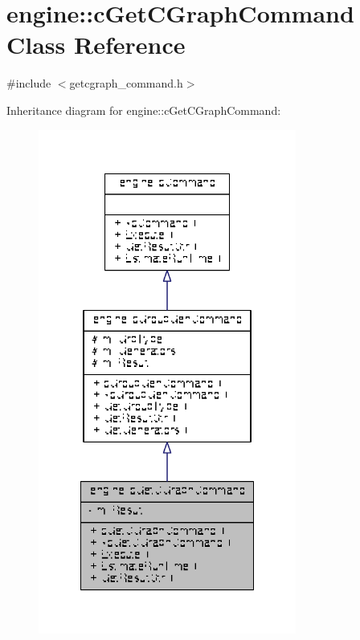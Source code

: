 \hypertarget{classengine_1_1cGetCGraphCommand}{\section{engine\-:\-:c\-Get\-C\-Graph\-Command Class Reference}
\label{classengine_1_1cGetCGraphCommand}
}


{\ttfamily \#include $<$getcgraph\-\_\-command.\-h$>$}



Inheritance diagram for engine\-:\-:c\-Get\-C\-Graph\-Command\-:
\nopagebreak
\begin{figure}[H]
\begin{center}
\leavevmode
\includegraphics[width=240pt]{classengine_1_1cGetCGraphCommand__inherit__graph}
\end{center}
\end{figure}


